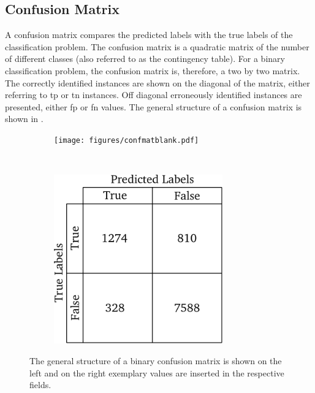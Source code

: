 \subsection{Confusion Matrix}\label{sec:confmatr}
A confusion matrix compares the predicted labels with the true labels of the classification problem. The confusion matrix is a quadratic matrix of the number of different classes (also referred to as the contingency table). For a binary classification problem, the confusion matrix is, therefore, a two by two matrix. The correctly identified instances are shown on the diagonal of the matrix, either referring to \ac{tp} or \ac{tn} instances. Off diagonal erroneously identified instances are presented, either \ac{fp} or \ac{fn} values. The general structure of a confusion matrix is shown in .
\begin{figure}[H]
	\centering
	\begin{subfigure}[c]{0.35\textwidth}
		\centering
		\texttt{[image: figures/confmatblank.pdf]}
		\label{fig:confmat1}
	\end{subfigure}
	~~~~~~~~~~
	\begin{subfigure}[c]{0.35\textwidth}
		\centering
		\includegraphics[width=0.8\textwidth]{figures/confmatexemp.pdf}
		\label{fig:confmat2}
	\end{subfigure}
	\caption[Structure of a Confusion Matrix]{The general structure of a binary confusion matrix is shown on the left and on the right exemplary values are inserted in the respective fields.}
	\label{fig:confmat}
\end{figure}\noindent
